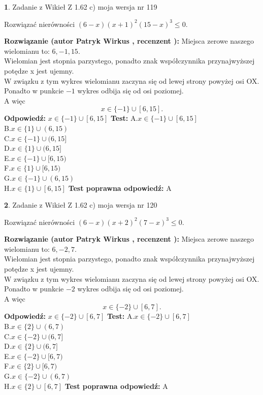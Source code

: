 \documentclass[12pt, a4paper]{article}
\theoremstyle{definition} %
\newtheorem{zad}{}
\newcommand{\zadStart}[1]{\begin{zad}#1\newline}
\newcommand{\zadStop}{\end{zad}}
\newcommand{\rozwStart}[2]{\noindent \textbf{Rozwiązanie (autor #1 , recenzent #2): }\newline}
\newcommand{\rozwStop}{\newline}
\newcommand{\odpStart}{\noindent \textbf{Odpowiedź:}\newline}
\newcommand{\odpStop}{\newline}
\newcommand{\testStart}{\noindent \textbf{Test:}\newline}
\newcommand{\testStop}{\newline}
\newcommand{\kluczStart}{\noindent \textbf{Test poprawna odpowiedź:}\newline}
\newcommand{\kluczStop}{\newline}
\begin{document}
\zadStart{Zadanie z Wikieł Z 1.62 c) moja wersja nr 119}

Rozwiązać nierówności $(6-x)(x+1)^{2}(15-x)^{3}\le0$.
\zadStop
\rozwStart{Patryk Wirkus}{}
Miejsca zerowe naszego wielomianu to: $6, -1, 15$.\\
Wielomian jest stopnia parzystego, ponadto znak współczynnika przy\linebreak najwyższej potędze x jest ujemny.\\ W związku z tym wykres wielomianu zaczyna się od lewej strony powyżej osi OX.\\
Ponadto w punkcie $-1$ wykres odbija się od osi poziomej.\\
A więc $$x \in \{-1\} \cup [6,15].$$
\rozwStop
\odpStart
$x \in \{-1\} \cup [6,15]$
\odpStop
\testStart
A.$x \in \{-1\} \cup [6,15]$\\
B.$x \in \{1\} \cup (6,15)$\\
C.$x \in \{-1\} \cup (6,15]$\\
D.$x \in \{1\} \cup (6,15]$\\
E.$x \in \{-1\} \cup [6,15)$\\
F.$x \in \{1\} \cup [6,15)$\\
G.$x \in \{-1\} \cup (6,15)$\\
H.$x \in \{1\} \cup [6,15]$
\testStop
\kluczStart
A
\kluczStop



\zadStart{Zadanie z Wikieł Z 1.62 c) moja wersja nr 120}

Rozwiązać nierówności $(6-x)(x+2)^{2}(7-x)^{3}\le0$.
\zadStop
\rozwStart{Patryk Wirkus}{}
Miejsca zerowe naszego wielomianu to: $6, -2, 7$.\\
Wielomian jest stopnia parzystego, ponadto znak współczynnika przy\linebreak najwyższej potędze x jest ujemny.\\ W związku z tym wykres wielomianu zaczyna się od lewej strony powyżej osi OX.\\
Ponadto w punkcie $-2$ wykres odbija się od osi poziomej.\\
A więc $$x \in \{-2\} \cup [6,7].$$
\rozwStop
\odpStart
$x \in \{-2\} \cup [6,7]$
\odpStop
\testStart
A.$x \in \{-2\} \cup [6,7]$\\
B.$x \in \{2\} \cup (6,7)$\\
C.$x \in \{-2\} \cup (6,7]$\\
D.$x \in \{2\} \cup (6,7]$\\
E.$x \in \{-2\} \cup [6,7)$\\
F.$x \in \{2\} \cup [6,7)$\\
G.$x \in \{-2\} \cup (6,7)$\\
H.$x \in \{2\} \cup [6,7]$
\testStop
\kluczStart
A
\kluczStop
\end{document}
